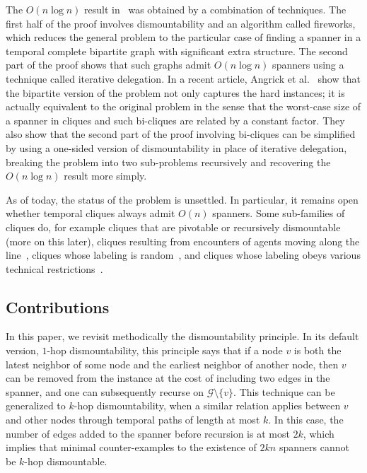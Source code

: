 \documentclass[USenglish, a4paper, thm-restate,numberwithinsect, cleveref]{lipics-v2021}
\newcommand{\G}{\ensuremath{\mathcal{G}}\xspace}
\begin{document}
The $O(n \log n)$ result in~\cite{CPS19} was obtained by a combination of techniques. The first half of the proof involves dismountability and an algorithm called fireworks, which reduces the general problem to the particular case of finding a spanner in a temporal complete bipartite graph with significant extra structure. The second part of the proof shows that such graphs admit $O(n \log n)$ spanners using a technique called iterative delegation. In a recent article, Angrick et al.~\cite{Hasso} show that
the bipartite version of the problem not only captures the hard instances; it is actually equivalent to the original problem in the sense that the worst-case size of a spanner in cliques and such bi-cliques are related by a constant factor. They also show that the second part of the proof involving bi-cliques can be simplified by using a one-sided version of dismountability in place of iterative delegation, breaking the problem into two sub-problems recursively and recovering the $O(n \log n)$ result more simply.

As of today, the status of the problem is unsettled. In particular, it remains open whether temporal cliques always admit $O(n)$ spanners. Some sub-families of cliques do, for example cliques that are pivotable or recursively dismountable~\cite{CPS19} (more on this later), cliques resulting from encounters of agents moving along the line~\cite{HNRV23}, cliques whose labeling is random~\cite{CRRZ21}, and cliques whose labeling obeys various technical restrictions~\cite{Hasso}.

\subsection{Contributions}

In this paper, we revisit methodically the dismountability principle. In its default version, $1$-hop dismountability, this principle says that if a node $v$ is both the latest neighbor of some node and the earliest neighbor of another node, then $v$ can be removed from the instance at the cost of including two edges in the spanner, and one can subsequently recurse on $\G \setminus \{v\}$. This technique can be generalized to $k$-hop dismountability, when a similar relation applies between $v$ and other nodes through temporal paths of length at most $k$. In this case, the number of edges added to the spanner before recursion is at most $2k$, which implies that minimal counter-examples to the existence of $2kn$ spanners cannot be $k$-hop dismountable.
\end{document}
